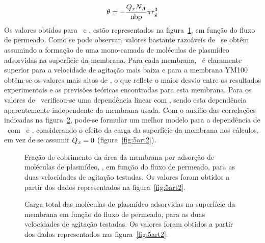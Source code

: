 \begin{equation}
\label{eq:fracaoart2}
\theta=-\frac{Q_{x}N_{A}}{\mathrm{nbp}}\pi r_{\mathrm{g}}^3
\end{equation} 
Os valores obtidos para \cargamembrana\ e \fracaomembrana, estão representados na figura~\ref{fig:6abcart2}, em função do fluxo de permeado. Como se pode observar, valores bastante razoáveis de \fracaomembrana\ se obtêm assumindo a formação de uma mono-camada de moléculas de plasmídeo adsorvidas na superfície da membrana. Para cada membrana, \fracaomembrana\ é claramente superior para a velocidade de agitação mais baixa e para a membrana YM100 obtêm-se os valores mais altos de \fracaomembrana, o que reflete o maior desvio entre os resultados experimentais e as previsões teóricas encontradas para esta membrana. Para os valores de \cargamembrana\ verificou-se uma dependência linear com \fluxo, sendo esta dependência aparentemente independente da membrana usada. Com o auxílio das correlações indicadas na figura~\ref{fig:6dart2}, pode-se formular um melhor modelo para a dependência de \permobs\ com \fluxo\ e \agitacao, considerando o efeito da carga da superfície da membrana nos cálculos, em vez de se assumir $Q_{x}=0$ (figura~\ref{fig:5art2}). 
\begin{figure}
	\centering
	\setlength\figureheight{5cm} 
	\setlength\figurewidth{5cm}
	
	\caption[Fração de cobrimento, \fracaomembrana, da área de membrana por pDNA]{Fração de cobrimento da área da membrana por adsorção de moléculas de plasmídeo, \fracaomembrana, em função do fluxo de permeado, para as duas velocidades de agitação testadas. Os valores foram obtidos a partir dos dados representados na figura~\ref{fig:5art2}.}
	\label{fig:6abcart2}
\end{figure}
\begin{figure}
	\centering
	\setlength\figureheight{6cm} 
	\setlength\figurewidth{6cm}
	
	\caption[Carga total das moléculas de plasmídeo adsorvidas na superfície da membrana]{Carga total das moléculas de plasmídeo adsorvidas na superfície da membrana em função do fluxo de permeado, para as duas velocidades de agitação testadas. Os valores foram obtidos a partir dos dados representados nas figura~\ref{fig:5art2}.}
	\label{fig:6dart2}
\end{figure}

